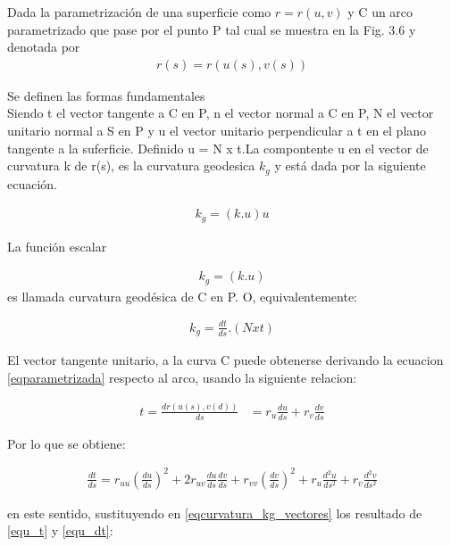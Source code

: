 \documentclass{endm}
\begin{document}
Dada la parametrizaci\'on de una superficie como $r=r(u,v)$ y  C un arco parametrizado que pase por el punto P tal cual se muestra en la Fig. 3.6 y denotada por
\begin{align} 
r(s) = r(u(s), v(s))
 \label{eqparametrizada}
\end{align}

Se definen las formas fundamentales\\

Siendo t el vector tangente a C en P, n el vector normal a C en P, N el vector unitario normal a S en P y u el vector unitario perpendicular a t en el plano tangente a la suferficie. Definido u = N x t.La compontente u en el vector de curvatura k de r(s), es la curvatura geodesica $k_g$ y est\'a dada por la siguiente ecuaci\'on.

\begin{align} 
k_g = (k.u)u
 \label{eqcurvatura_k_g}
\end{align}

La funci\'on escalar

\begin{align} 
k_g = (k.u)
 \label{eqcurvatura_kg}
\end{align}
es llamada curvatura geod\'esica de C en P.
O, equivalentemente:

\begin{align} 
k_g = \frac{dt}{ds} . (N x t)
 \label{eqcurvatura_kg_vectores}
\end{align}

El vector tangente unitario, a la curva C puede obtenerse derivando la ecuacion \ref{eqparametrizada} respecto al arco, usando la siguiente relacion:

\begin{align} 
t = \frac{d r(u(s), v(d))}{ds}&=r_u \frac{d u}{ds} + r_v \frac{d v}{ds}
 \label{equ_t}
\end{align}

Por lo que se obtiene:

\begin{align} 
 \frac{d t}{ds} = r_{uu} (\frac{d u}{ds})^2 +
 2 r_{uv} \frac{d u}{ds} \frac{d v}{ds}
 + r_{vv} (\frac{d v}{ds})^2 +
 r_u \frac{d^2 u}{ds^2} +
 r_v \frac{d^2 v}{ds^2}
 \label{equ_dt}
\end{align}

en este sentido, sustituyendo en \ref{eqcurvatura_kg_vectores} los resultado de \ref{equ_t} y \ref{equ_dt}:
\end{document}
